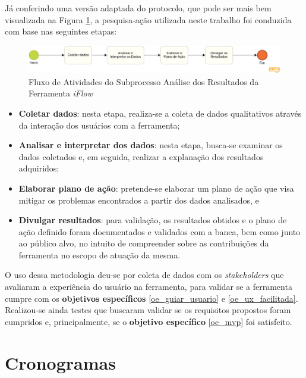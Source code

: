Já conferindo uma versão adaptada do protocolo, que pode ser mais bem visualizada na Figura \ref{fig:bpmn_analise}, a pesquisa-ação utilizada neste trabalho foi conduzida com base nas seguintes etapas:

\begin{figure}[H]
    \begin{center}
        \caption{Fluxo de Atividades do Subprocesso Análise dos Resultados da Ferramenta \textit{iFlow}}
        \label{fig:bpmn_analise}
        \includegraphics[scale=0.28]{figuras/Metodologia/bpmn_analise.png}
    \end{center}
\end{figure}

\begin{itemize}
    \item \textbf{Coletar dados}: nesta etapa, realiza-se a coleta de dados qualitativos através da interação dos usuários com a ferramenta;
    \item \textbf{Analisar e interpretar dos dados}: nesta etapa, busca-se examinar os dados coletados e, em seguida, realizar a explanação dos resultados adquiridos;
    \item \textbf{Elaborar plano de ação}: pretende-se elaborar um plano de ação que visa mitigar os problemas encontrados a partir dos dados analisados, e 
    \item \textbf{Divulgar resultados}: para validação, os resultados obtidos e o plano de ação definido foram documentados e validados com a banca, bem como junto ao público alvo, no intuito de compreender sobre as contribuições da ferramenta no escopo de atuação da mesma.
\end{itemize}

O uso dessa metodologia deu-se por coleta de dados com os \textit{stakeholders} que avaliaram a experiência do usuário na ferramenta, para validar se a ferramenta cumpre com os \textbf{objetivos específicos} \ref{oe_guiar_usuario} e \ref{oe_ux_facilitada}. Realizou-se ainda testes que buscaram validar se os requisitos propostos foram cumpridos e, principalmente, se o \textbf{objetivo específico} \ref{oe_mvp} foi satisfeito.

\section{Cronogramas}

